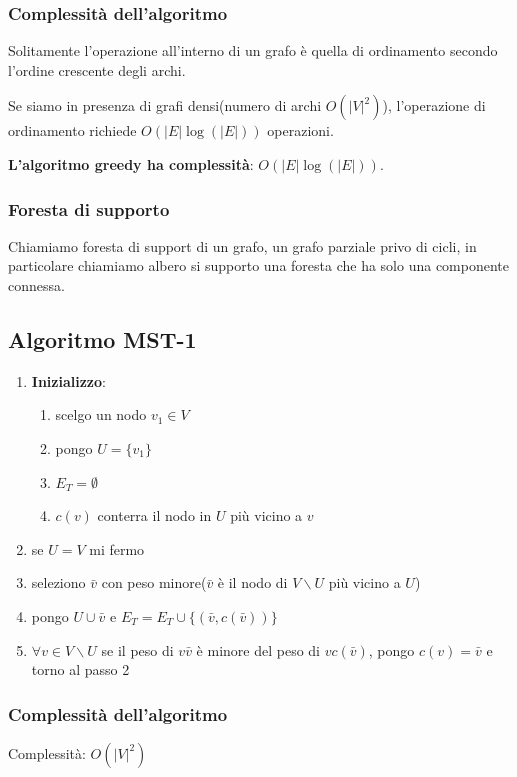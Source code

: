\subsubsection{Complessità dell'algoritmo}
Solitamente l'operazione all'interno di un grafo è quella di ordinamento secondo l'ordine crescente degli archi.

Se siamo in presenza di grafi densi(numero di archi $O(|V|^2)$), l'operazione di ordinamento richiede
$O(|E|\log(|E|))$ operazioni.

\textbf{L'algoritmo greedy ha complessità}: $O(|E|\log(|E|))$.

\subsubsection{Foresta di supporto}
Chiamiamo foresta di support di un grafo, un grafo parziale privo di cicli, in particolare chiamiamo albero si 
supporto una foresta che ha solo una componente connessa.

\subsection{Algoritmo MST-1}
\begin{enumerate}
    \item \textbf{Inizializzo}: 
    \begin{enumerate}
        \item scelgo un nodo $v_1 \in V$
        \item pongo $U = \{v_1\}$
        \item $E_T = \emptyset$
        \item $c(v)$ conterra il nodo in $U$ più vicino a $v$
    \end{enumerate}
    \item se $U = V$ mi fermo
    \item seleziono $\bar{v}$ con peso minore($\bar{v}$ è il nodo di $V \backslash U$ più vicino a $U$)
    \item pongo $U \cup {\bar{v}}$ e $E_T = E_T \cup \{(\bar{v}, c(\bar{v}))\}$
    \item $\forall v \in V \backslash U$ se il peso di $v\bar{v}$ è minore del peso di $vc(\bar{v})$, pongo $c(v) = \bar{v}$ e torno al passo 2
\end{enumerate}

\subsubsection{Complessità dell'algoritmo}
Complessità: $O(|V|^2)$

